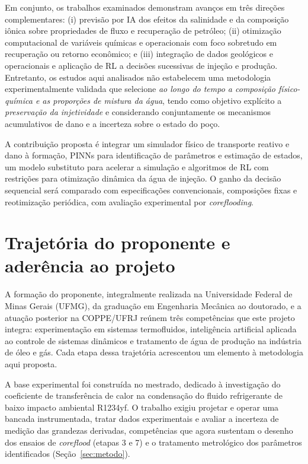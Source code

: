 \documentclass[10pt,a4paper]{article}
\begin{document}
Em conjunto, os trabalhos examinados demonstram avanços em três direções complementares: (i) previsão por IA dos efeitos da salinidade e da composição iônica sobre propriedades de fluxo e recuperação de petróleo; (ii) otimização computacional de variáveis químicas e operacionais com foco sobretudo em recuperação ou retorno econômico; e (iii) integração de dados geológicos e operacionais e aplicação de RL a decisões sucessivas de injeção e produção. Entretanto, os estudos aqui analisados não estabelecem uma metodologia experimentalmente validada que selecione \emph{ao longo do tempo a composição físico-química e as proporções de mistura da água}, tendo como objetivo explícito a \emph{preservação da injetividade} e considerando conjuntamente os mecanismos acumulativos de dano e a incerteza sobre o estado do poço.

A contribuição proposta é integrar um simulador físico de transporte reativo e dano à formação, PINNs para identificação de parâmetros e estimação de estados, um modelo substituto para acelerar a simulação e algoritmos de RL com restrições para otimização dinâmica da água de injeção. O ganho da decisão sequencial será comparado com especificações convencionais, composições fixas e reotimização periódica, com avaliação experimental por \textit{coreflooding}.

\section{Trajetória do proponente e aderência ao projeto}\label{sec:prelim}
A formação do proponente, integralmente realizada na Universidade Federal de Minas Gerais
(UFMG), da graduação em Engenharia Mecânica ao doutorado, e a atuação posterior na COPPE/UFRJ
reúnem três competências que este projeto integra: experimentação em sistemas termofluidos,
inteligência artificial aplicada ao controle de sistemas dinâmicos e tratamento de água de
produção na indústria de óleo e gás. Cada etapa dessa trajetória acrescentou um elemento à
metodologia aqui proposta.

A base experimental foi construída no mestrado, dedicado à investigação do coeficiente de
transferência de calor na condensação do fluido refrigerante de baixo impacto ambiental
R1234yf. O trabalho exigiu projetar e operar uma bancada instrumentada, tratar dados
experimentais e avaliar a incerteza de medição das grandezas derivadas, competências que
agora sustentam o desenho dos ensaios de \textit{coreflood} (etapas 3 e 7) e o tratamento
metrológico dos parâmetros identificados (Seção~\ref{sec:metodo}).
\end{document}
